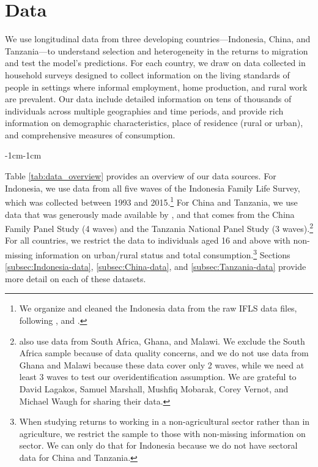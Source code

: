 \documentclass[12pt]{article}
\begin{document}
\section{Data}\label{sec:data}

We use longitudinal data from three developing countries---Indonesia, China, and Tanzania---to understand selection and heterogeneity in the returns to migration and test the model's predictions.
For each country, we draw on data collected in household surveys designed to collect information on the living standards of people in settings where informal employment, home production, and rural work are prevalent. 
Our data include detailed information on tens of thousands of individuals across multiple geographies and time periods, and provide rich information on demographic characteristics,  place of residence (rural or urban), and comprehensive measures of consumption.%



\begin{table}[htbp]
    \begin{adjustwidth}{-1cm}{-1cm}
        \centering
        
        \caption{Overview of Data Sources}\label{tab:data_overview}
    \end{adjustwidth}
\end{table}

Table \ref{tab:data_overview} provides an overview of our data sources. For Indonesia, we use data from all five waves of the Indonesia Family Life Survey, which was collected between 1993 and 2015.\footnote{We organize and cleaned the Indonesia data from the raw IFLS data files, following \cite{kleemansLabourMarketResponses2018}, \cite{hamoryReevaluatingAgriculturalProductivity2021} and \cite{kleemansMigrationChoiceRisk}.} For China and Tanzania, we use data that was generously made available by \cite{lagakosMigrationCostsObservational2020}, and that comes from the China Family Panel Study (4 waves) and the Tanzania National Panel Study (3 waves).\footnote{\cite{lagakosMigrationCostsObservational2020} also use data from South Africa, Ghana, and Malawi. We exclude the South Africa sample because of data quality concerns, and we do not use data from Ghana and Malawi because these data cover only 2 waves, while we need at least 3 waves to test our overidentification assumption. We are grateful to David Lagakos, Samuel Marshall, Mushfiq Mobarak, Corey Vernot, and Michael Waugh for sharing their data.}
For all countries, we restrict the data to individuals aged 16 and above with non-missing information on urban/rural status and total consumption.\footnote{When studying returns to working in a non-agricultural sector rather than in agriculture, we restrict the sample to those with non-missing information on sector. We can only do that for Indonesia because we do not have sectoral data for China and Tanzania.} Sections \ref{subsec:Indonesia-data}, \ref{subsec:China-data}, and \ref{subsec:Tanzania-data} provide more detail on each of these datasets. 
\end{document}
